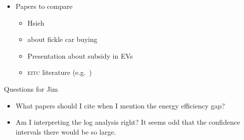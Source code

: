 \documentclass[11pt,letterpaper,oneside]{article}
\newcommand{\eitc}{\textsc{eitc}}
\begin{document}
\begin{itemize}
    \item Papers to compare
    \begin{itemize}
        \item Hsieh
        \item \textcite{Busse2015_weather_on_cars} about fickle car buying
        \item Presentation about subsidy in EVs
        \item \eitc{} literature (e.g.\ \cite{goodman2008eitc})
    \end{itemize}
\end{itemize}

{\Large Questions for Jim}
\begin{itemize}
    \item What papers should I cite when I mention the energy efficiency gap?
    \item Am I interpreting the log analysis right?  It seems odd that the confidence intervals there would be so large.
\end{itemize}
\pagebreak
\setcounter{page}{1}
\end{document}

